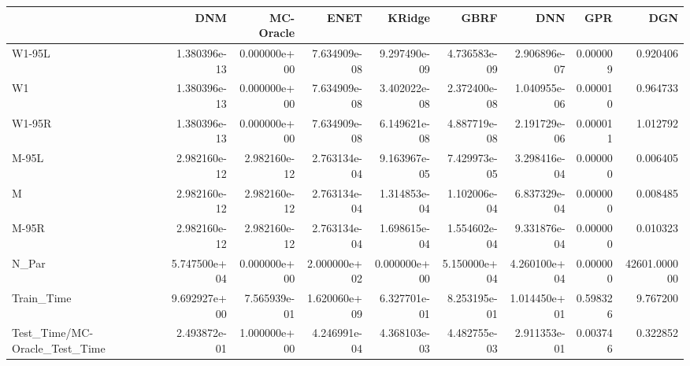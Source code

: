 \begin{tabular}{lrrrrrrrr}
\toprule
{} &           DNM &     MC-Oracle &          ENET &        KRidge &          GBRF &           DNN &       GPR &           DGN \\
\midrule
W1-95L                        &  1.380396e-13 &  0.000000e+00 &  7.634909e-08 &  9.297490e-09 &  4.736583e-09 &  2.906896e-07 &  0.000009 &      0.920406 \\
W1                            &  1.380396e-13 &  0.000000e+00 &  7.634909e-08 &  3.402022e-08 &  2.372400e-08 &  1.040955e-06 &  0.000010 &      0.964733 \\
W1-95R                        &  1.380396e-13 &  0.000000e+00 &  7.634909e-08 &  6.149621e-08 &  4.887719e-08 &  2.191729e-06 &  0.000011 &      1.012792 \\
M-95L                         &  2.982160e-12 &  2.982160e-12 &  2.763134e-04 &  9.163967e-05 &  7.429973e-05 &  3.298416e-04 &  0.000000 &      0.006405 \\
M                             &  2.982160e-12 &  2.982160e-12 &  2.763134e-04 &  1.314853e-04 &  1.102006e-04 &  6.837329e-04 &  0.000000 &      0.008485 \\
M-95R                         &  2.982160e-12 &  2.982160e-12 &  2.763134e-04 &  1.698615e-04 &  1.554602e-04 &  9.331876e-04 &  0.000000 &      0.010323 \\
N\_Par                         &  5.747500e+04 &  0.000000e+00 &  2.000000e+02 &  0.000000e+00 &  5.150000e+04 &  4.260100e+04 &  0.000000 &  42601.000000 \\
Train\_Time                    &  9.692927e+00 &  7.565939e-01 &  1.620060e+09 &  6.327701e-01 &  8.253195e-01 &  1.014450e+01 &  0.598326 &      9.767200 \\
Test\_Time/MC-Oracle\_Test\_Time &  2.493872e-01 &  1.000000e+00 &  4.246991e-04 &  4.368103e-03 &  4.482755e-03 &  2.911353e-01 &  0.003746 &      0.322852 \\
\bottomrule
\end{tabular}
